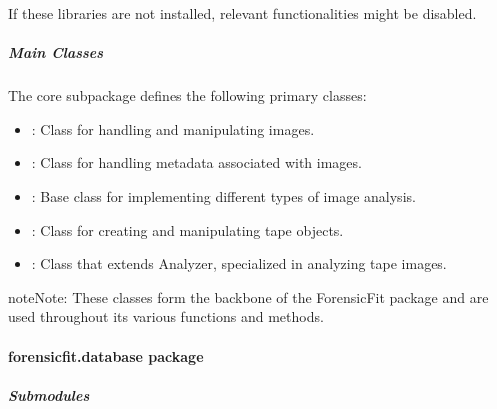 \documentclass[letterpaper,10pt,english]{sphinxmanual}
\begin{document}
\sphinxAtStartPar
If these libraries are not installed, relevant functionalities might be disabled.


\subparagraph{Main Classes}
\label{\detokenize{forensicfit.core:main-classes}}
\sphinxAtStartPar
The core subpackage defines the following primary classes:
\begin{itemize}
\item {} 
\sphinxAtStartPar
{} : Class for handling and manipulating images.

\item {} 
\sphinxAtStartPar
{} : Class for handling metadata associated with images.

\item {} 
\sphinxAtStartPar
{\hyperref[\detokenize{forensicfit.core.analyzer:forensicfit.core.analyzer.Analyzer}]{}} : Base class for implementing different types of image analysis.

\item {} 
\sphinxAtStartPar
{\hyperref[\detokenize{forensicfit.core.tape:forensicfit.core.tape.Tape}]{}} : Class for creating and manipulating tape objects.

\item {} 
\sphinxAtStartPar
{\hyperref[\detokenize{forensicfit.core.tape:forensicfit.core.tape.TapeAnalyzer}]{}} : Class that extends Analyzer, specialized in analyzing tape images.

\end{itemize}

\begin{sphinxadmonition}{note}{Note:}
\sphinxAtStartPar
These classes form the backbone of the ForensicFit package and are used throughout its various functions and methods.
\end{sphinxadmonition}

\sphinxstepscope


\paragraph{forensicfit.database package}
\label{\detokenize{forensicfit.database:forensicfit-database-package}}\label{\detokenize{forensicfit.database::doc}}

\subparagraph{Submodules}
\label{\detokenize{forensicfit.database:submodules}}
\sphinxstepscope
\end{document}

